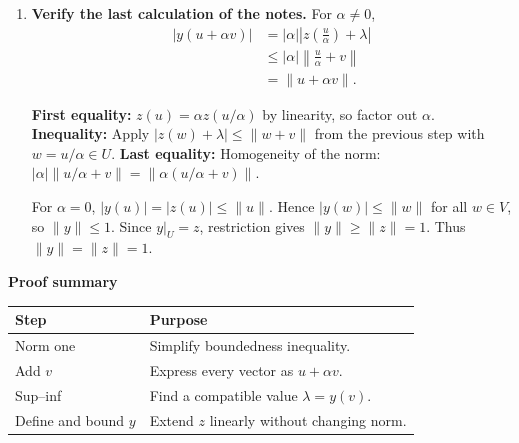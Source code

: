 \documentclass[11pt,a4paper]{article}
\newenvironment{proofsteps}{\begin{enumerate}\setlength{\itemsep}{4pt}}{\end{enumerate}}
\newcommand{\prooftable}[1]{\medskip\textbf{Proof summary}\par\smallskip #1\medskip}
\begin{document}
\begin{proofsteps}
\item \textbf{Verify the last calculation of the notes.} For \(\alpha\ne0\),
\[
 \begin{aligned}
 |y(u+\alpha v)|
 &=|\alpha|\left|z\left(\frac{u}{\alpha}\right)+\lambda\right|\\
 &\leq|\alpha|\left\|\frac{u}{\alpha}+v\right\|\\
 &=\|u+\alpha v\|.
 \end{aligned}
\]
\begin{personalnote}
\textbf{First equality:} \(z(u)=\alpha z(u/\alpha)\) by linearity, so factor out \(\alpha\).
\textbf{Inequality:} Apply \(|z(w)+\lambda|\leq\|w+v\|\) from the previous step with \(w=u/\alpha\in U\).
\textbf{Last equality:} Homogeneity of the norm:
\(|\alpha|\|u/\alpha+v\|=\|\alpha(u/\alpha+v)\|\).
\end{personalnote}
For \(\alpha=0\), \(|y(u)|=|z(u)|\leq\|u\|\).
Hence \(|y(w)|\leq\|w\|\) for all \(w\in V\), so \(\|y\|\leq1\). Since \(y|_U=z\), restriction gives \(\|y\|\geq\|z\|=1\). Thus \(\boxed{\|y\|=\|z\|=1}\).
\end{proofsteps}
\prooftable{\begin{tabularx}{\linewidth}{@{}p{.26\linewidth}X@{}}\hline
Step & Purpose\\\hline
Norm one & Simplify boundedness inequality.\\
Add \(v\) & Express every vector as \(u+\alpha v\).\\
Sup--inf & Find a compatible value \(\lambda=y(v)\).\\
Define and bound \(y\) & Extend \(z\) linearly without changing norm.\\\hline
\end{tabularx}}
\end{document}
